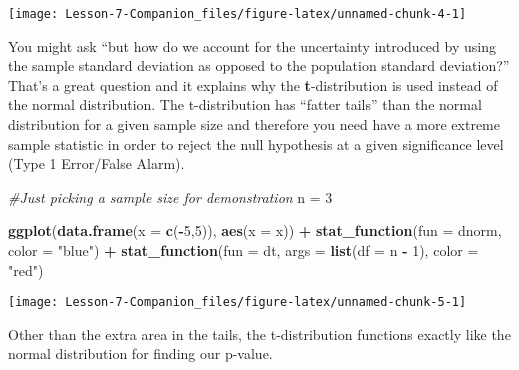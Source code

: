 \documentclass[
]{article}
\newenvironment{Shaded}{\begin{snugshade}}{\end{snugshade}}
\newcommand{\CommentTok}[1]{\textcolor[rgb]{0.56,0.35,0.01}{\textit{#1}}}
\newcommand{\DataTypeTok}[1]{\textcolor[rgb]{0.13,0.29,0.53}{#1}}
\newcommand{\DecValTok}[1]{\textcolor[rgb]{0.00,0.00,0.81}{#1}}
\newcommand{\KeywordTok}[1]{\textcolor[rgb]{0.13,0.29,0.53}{\textbf{#1}}}
\newcommand{\NormalTok}[1]{#1}
\newcommand{\OperatorTok}[1]{\textcolor[rgb]{0.81,0.36,0.00}{\textbf{#1}}}
\newcommand{\StringTok}[1]{\textcolor[rgb]{0.31,0.60,0.02}{#1}}
\begin{document}
\begin{center}\texttt{[image: Lesson-7-Companion\_files/figure-latex/unnamed-chunk-4-1]} \end{center}

You might ask ``but how do we account for the uncertainty introduced by
using the sample standard deviation as opposed to the population
standard deviation?'' That's a great question and it explains why the
\textbf{t}-distribution is used instead of the normal distribution. The
t-distribution has ``fatter tails'' than the normal distribution for a
given sample size and therefore you need have a more extreme sample
statistic in order to reject the null hypothesis at a given significance
level (Type 1 Error/False Alarm).

\begin{Shaded}
\begin{Highlighting}[]
\CommentTok{#Just picking a sample size for demonstration}
\NormalTok{n =}\StringTok{ }\DecValTok{3}

\KeywordTok{ggplot}\NormalTok{(}\KeywordTok{data.frame}\NormalTok{(}\DataTypeTok{x =} \KeywordTok{c}\NormalTok{(}\OperatorTok{-}\DecValTok{5}\NormalTok{,}\DecValTok{5}\NormalTok{)), }\KeywordTok{aes}\NormalTok{(}\DataTypeTok{x =}\NormalTok{ x)) }\OperatorTok{+}
\StringTok{  }\KeywordTok{stat_function}\NormalTok{(}\DataTypeTok{fun =}\NormalTok{ dnorm,}
                \DataTypeTok{color =} \StringTok{"blue"}\NormalTok{) }\OperatorTok{+}
\StringTok{  }\KeywordTok{stat_function}\NormalTok{(}\DataTypeTok{fun =}\NormalTok{ dt,}
                \DataTypeTok{args =} \KeywordTok{list}\NormalTok{(}\DataTypeTok{df =}\NormalTok{ n }\OperatorTok{-}\StringTok{ }\DecValTok{1}\NormalTok{),}
                \DataTypeTok{color =} \StringTok{"red"}\NormalTok{)}
\end{Highlighting}
\end{Shaded}

\begin{center}\texttt{[image: Lesson-7-Companion\_files/figure-latex/unnamed-chunk-5-1]} \end{center}

Other than the extra area in the tails, the t-distribution functions
exactly like the normal distribution for finding our p-value.
\end{document}
